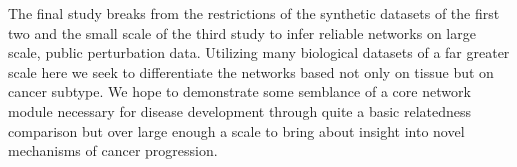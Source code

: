 \begin{abstracts}
The final study breaks from the restrictions of the synthetic datasets of the first two and the small scale of the third study to infer reliable networks on large scale, public perturbation data. Utilizing many biological datasets of a far greater scale here we seek to differentiate the networks based not only on tissue but on cancer subtype. We hope to demonstrate some semblance of a core network module necessary for disease development through quite a basic relatedness comparison but over large enough a scale to bring about insight into novel mechanisms of cancer progression.


\end{abstracts}


